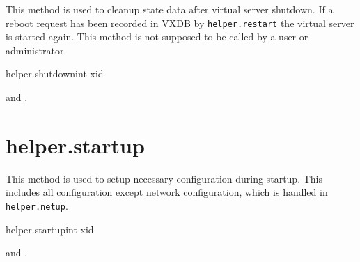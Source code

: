 This method is used to cleanup state data after virtual server shutdown. If a
reboot request has been recorded in VXDB by \texttt{helper.restart} the virtual
server is started again. This method is not supposed to be called by a user or
administrator.

\begin{rpcsynopsis}{helper.shutdown}{int xid}
\end{rpcsynopsis}

\begin{rpcaccess}
 and \rpcnoownerchecks.
\end{rpcaccess}

\rpcreturnnil

\rpcnoerrors



\section{helper.startup}

This method is used to setup necessary configuration during startup. This
includes all configuration except network configuration, which is handled in
\texttt{helper.netup}. %

\begin{rpcsynopsis}{helper.startup}{int xid}
\end{rpcsynopsis}

\begin{rpcaccess}
 and \rpcnoownerchecks.
\end{rpcaccess}

\rpcreturnnil

\rpcnoerrors
